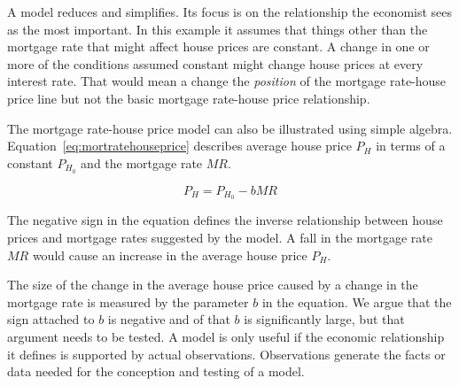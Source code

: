 A model reduces and simplifies. Its focus is on the relationship the economist sees as the most important. In this example it assumes that things other than the mortgage rate that might affect house prices are constant. A change in one or more of the conditions assumed constant might change house prices at every interest rate. That would mean a change the \textit{position} of the mortgage rate-house price line but not the basic mortgage rate-house price relationship.

The mortgage rate-house price model can also be illustrated using simple algebra. Equation~\ref{eq:mortratehouseprice} describes average house price $P_H$ in terms of a constant $P_{H_0}$ and the mortgage rate $MR$.
 
\begin{equation} \label{eq:mortratehouseprice}
P_H=P_{H_0}-bMR
\end{equation}

The negative sign in the equation defines the inverse relationship between house prices and mortgage rates suggested by the model. A fall in the mortgage rate $MR$ would cause an increase in the average house price $P_H$. 

The size of the change in the average house price caused by a change in the mortgage rate is measured by the parameter $b$ in the equation. We argue that the sign attached to $b$ is negative and of that $b$ is significantly large, but that argument needs to be tested. A model is only useful if the economic relationship it defines is supported by actual observations. Observations generate the facts or data needed for the conception and testing of a model.